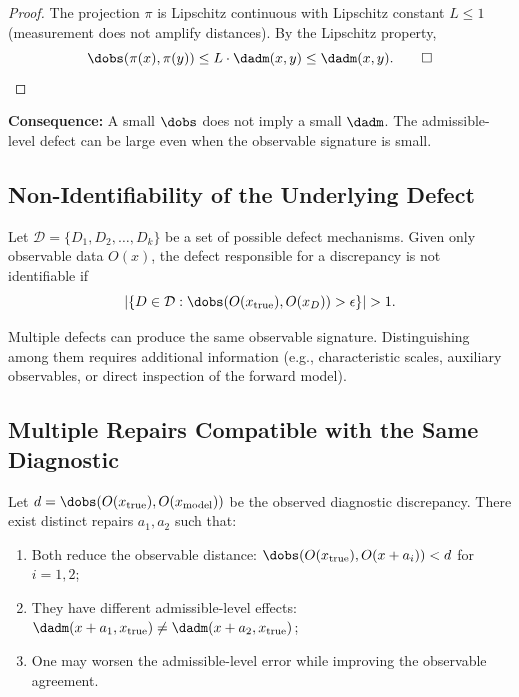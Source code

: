 \begin{proof}
The projection $\pi$ is Lipschitz continuous with Lipschitz constant $L \leq 1$ (measurement does not amplify distances). By the Lipschitz property,
\[
\dobs(\pi(x), \pi(y)) \leq L \cdot \dadm(x, y) \leq \dadm(x, y). \qed
\]
\end{proof}

\textbf{Consequence:} A small $\dobs$ does not imply a small $\dadm$. The admissible-level defect can be large even when the observable signature is small.


\subsection{Non-Identifiability of the Underlying Defect}

\begin{theorem}
Let $\mathcal{D} = \{D_1, D_2, \ldots, D_k\}$ be a set of possible defect mechanisms. Given only observable data $O(x)$, the defect responsible for a discrepancy is not identifiable if
\[
|\{D \in \mathcal{D} : \dobs(O(x_{\mathrm{true}}), O(x_D)) > \epsilon\}| > 1.
\]
\end{theorem}

Multiple defects can produce the same observable signature. Distinguishing among them requires additional information (e.g., characteristic scales, auxiliary observables, or direct inspection of the forward model).


\subsection{Multiple Repairs Compatible with the Same Diagnostic}

\begin{proposition}
Let $d = \dobs(O(x_{\mathrm{true}}), O(x_{\mathrm{model}}))$ be the observed diagnostic discrepancy. There exist distinct repairs $a_1, a_2$ such that:
\begin{enumerate}
\item Both reduce the observable distance: $\dobs(O(x_{\mathrm{true}}), O(x + a_i)) < d$ for $i = 1, 2$;
\item They have different admissible-level effects: $\dadm(x + a_1, x_{\mathrm{true}}) \neq \dadm(x + a_2, x_{\mathrm{true}})$;
\item One may worsen the admissible-level error while improving the observable agreement.
\end{enumerate}
\end{proposition}

